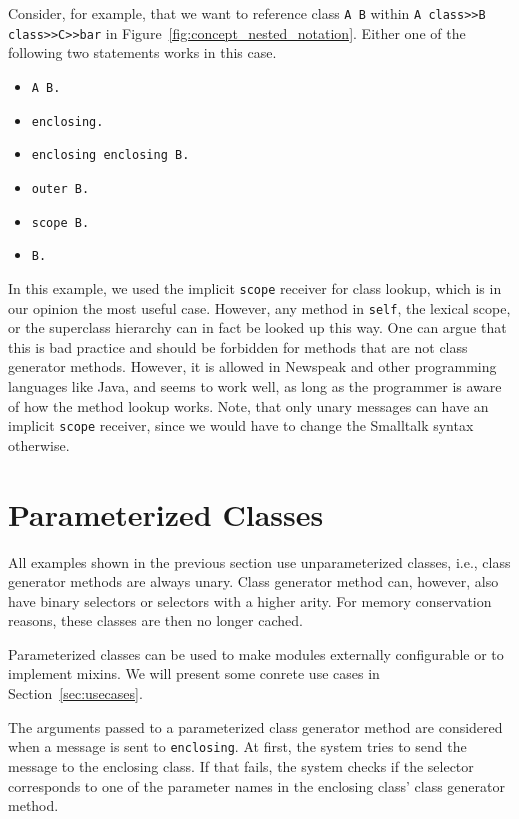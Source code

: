 Consider, for example, that we want to reference class \texttt{A B} within \texttt{A class>>B class>>C>>bar} in Figure~\ref{fig:concept_nested_notation}. Either one of the following two statements works in this case.

\begin{itemize}
	\item \texttt{A B.}
	\item \texttt{enclosing.}
	\item \texttt{enclosing enclosing B.}
	\item \texttt{outer B.}
	\item \texttt{scope B.}
	\item \texttt{B.}
\end{itemize}

In this example, we used the implicit \texttt{scope} receiver for class lookup, which is in our opinion the most useful case. However, any method in \texttt{self}, the lexical scope, or the superclass hierarchy can in fact be looked up this way. One can argue that this is bad practice and should be forbidden for methods that are not class generator methods. However, it is allowed in Newspeak and other programming languages like Java, and seems to work well, as long as the programmer is aware of how the method lookup works. Note, that only unary messages can have an implicit \texttt{scope} receiver, since we would have to change the Smalltalk syntax otherwise.

\section{Parameterized Classes}
All examples shown in the previous section use unparameterized classes, i.e., class generator methods are always unary. Class generator method can, however, also have binary selectors or selectors with a higher arity. For memory conservation reasons, these classes are then no longer cached.

Parameterized classes can be used to make modules externally configurable or to implement mixins. We will present some conrete use cases in Section~\ref{sec:usecases}.

The arguments passed to a parameterized class generator method are considered when a message is sent to \texttt{enclosing}. At first, the system tries to send the message to the enclosing class. If that fails, the system checks if the selector corresponds to one of the parameter names in the enclosing class' class generator method.
